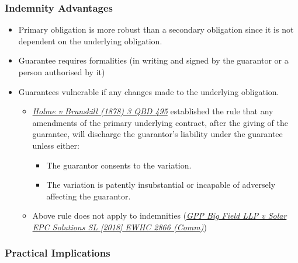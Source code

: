 \documentclass[
]{article}
\providecommand{\tightlist}{%
  \setlength{\itemsep}{0pt}\setlength{\parskip}{0pt}}
\begin{document}
\hypertarget{indemnity-advantages}{%
\subsubsection{Indemnity Advantages}\label{indemnity-advantages}}

\begin{itemize}
\tightlist
\item
  Primary obligation is more robust than a secondary obligation since it
  is not dependent on the underlying obligation.
\item
  Guarantee requires formalities (in writing and signed by the guarantor
  or a person authorised by it)
\item
  Guarantees vulnerable if any changes made to the underlying
  obligation.

  \begin{itemize}
  \tightlist
  \item
    \emph{\href{https://uk.westlaw.com/Document/IC2F31920E42711DA8FC2A0F0355337E9/View/FullText.html}{Holme
    v Brunskill (1878) 3 QBD 495}} established the rule that any
    amendments of the primary underlying contract, after the giving of
    the guarantee, will discharge the guarantor's liability under the
    guarantee unless either:

    \begin{itemize}
    \tightlist
    \item
      The guarantor consents to the variation.
    \item
      The variation is patently insubstantial or incapable of adversely
      affecting the guarantor.
    \end{itemize}
  \item
    Above rule does not apply to indemnities
    (\emph{\href{https://uk.westlaw.com/D-102-7705?originationContext=document\&transitionType=PLDocumentLink\&contextData=\%28sc.Default\%29\&comp=pluk}{GPP
    Big Field LLP v Solar EPC Solutions SL {[}2018{]} EWHC 2866
    (Comm)}})
  \end{itemize}
\end{itemize}

\hypertarget{practical-implications}{%
\subsubsection{Practical Implications}\label{practical-implications}}
\end{document}
